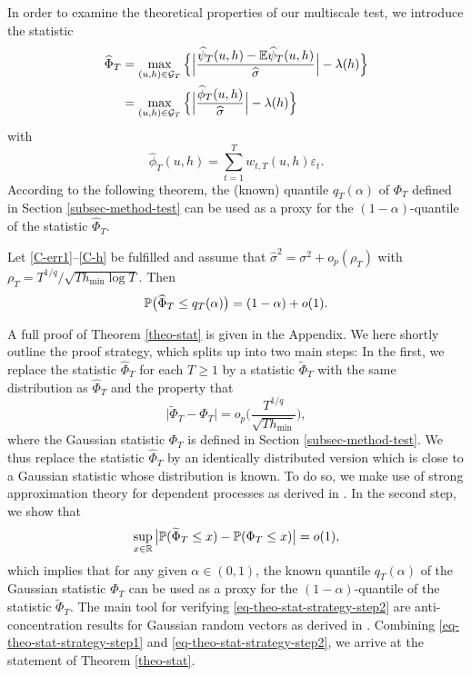 In order to examine the theoretical properties of our multiscale test, we introduce the statistic 
\begin{align}
\widehat{\Phi}_T 
 & = \max_{(u,h) \in \mathcal{G}_T} \Big\{ \Big| \frac{\widehat{\psi}_T(u,h) - \mathbb{E} \widehat{\psi}_T(u,h)}{\widehat{\sigma}} \Big| - \lambda(h) \Big\} \nonumber \\
 & = \max_{(u,h) \in \mathcal{G}_T} \Big\{ \Big| \frac{\widehat{\phi}_T(u,h)}{\widehat{\sigma}} \Big| - \lambda(h) \Big\} \label{Phi-hat-statistic}
\end{align}
with 
\[ \widehat{\phi}_T(u,h) = \sum\limits_{t=1}^T w_{t,T}(u,h) \varepsilon_t. \]
According to the following theorem, the (known) quantile $q_T(\alpha)$ of $\Phi_T$ defined in Section \ref{subsec-method-test} can be used as a proxy for the $(1-\alpha)$-quantile of the statistic $\widehat{\Phi}_T$.
\begin{theorem}\label{theo-stat}
Let \ref{C-err1}--\ref{C-h} be fulfilled and assume that $\widehat{\sigma}^2 = \sigma^2 + o_p(\rho_T)$ with $\rho_T = T^{1/q}/\sqrt{T h_{\min} \log T}$. Then 
\[ \mathbb{P} \big( \widehat{\Phi}_T \le q_T(\alpha) \big) = (1 - \alpha) + o(1). \]
\end{theorem}
A full proof of Theorem \ref{theo-stat} is given in the Appendix. 
We here shortly outline the proof strategy, which splits up into two main steps: In the first, we replace the statistic $\widehat{\Phi}_T$ for each $T \ge 1$ by a statistic $\widetilde{\Phi}_T$ with the same distribution as $\widehat{\Phi}_T$ and the property that 
\begin{equation}\label{eq-theo-stat-strategy-step1}
\big| \widetilde{\Phi}_T - \Phi_T \big| = o_p \Big( \frac{T^{1/q}}{\sqrt{T h_{\min}}} \Big),
\end{equation}
where the Gaussian statistic $\Phi_T$ is defined in Section \ref{subsec-method-test}. We thus replace the statistic $\widehat{\Phi}_T$ by an identically distributed version which is close to a Gaussian statistic whose distribution is known. To do so, we make use of strong approximation theory for dependent processes as derived in \cite{BerkesLiuWu2014}. In the second step, we show that 
\begin{equation}\label{eq-theo-stat-strategy-step2}
\sup_{x \in \mathbb{R}} \big| \mathbb{P}(\widetilde{\Phi}_T \le x) - \mathbb{P}(\Phi_T \le x) \big| = o(1), 
\end{equation}
which implies that for any given $\alpha \in (0,1)$, the known quantile $q_T(\alpha)$ of the Gaussian statistic $\Phi_T$ can be used as a proxy for the $(1-\alpha)$-quantile of the statistic $\widetilde{\Phi}_T$. The main tool for verifying \eqref{eq-theo-stat-strategy-step2} are anti-concentration results for Gaussian random vectors as derived in \cite{Chernozhukov2015}. Combining \eqref{eq-theo-stat-strategy-step1} and \eqref{eq-theo-stat-strategy-step2}, we arrive at the statement of Theorem \ref{theo-stat}. 


